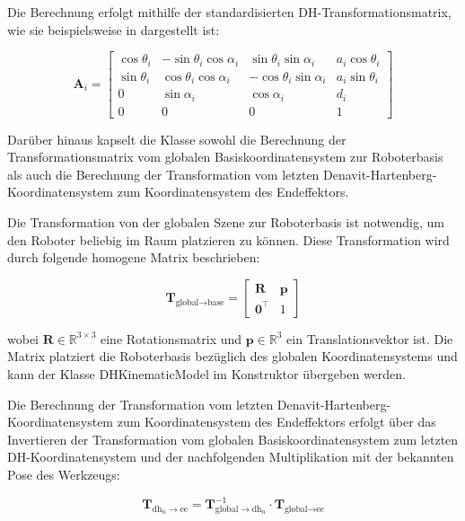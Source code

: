 Die Berechnung erfolgt mithilfe der standardisierten DH-Transformationsmatrix, wie sie beispielsweise in  dargestellt ist:

\[
    \mathbf{A}_i =
    \begin{bmatrix}
    \cos\theta_i & -\sin\theta_i\cos\alpha_i & \sin\theta_i\sin\alpha_i & a_i\cos\theta_i \\
    \sin\theta_i & \cos\theta_i\cos\alpha_i  & -\cos\theta_i\sin\alpha_i & a_i\sin\theta_i \\
    0            & \sin\alpha_i              & \cos\alpha_i              & d_i \\
    0            & 0                         & 0                         & 1
    \end{bmatrix}
\]



Darüber hinaus kapselt die Klasse sowohl die Berechnung der Transformationsmatrix vom globalen Basiskoordinatensystem zur Roboterbasis
als auch die Berechnung der Transformation vom letzten Denavit-Hartenberg-Koordinatensystem zum Koordinatensystem des Endeffektors.



Die Transformation von der globalen Szene zur Roboterbasis ist notwendig, um den Roboter beliebig im Raum platzieren zu können.
Diese Transformation wird durch folgende homogene Matrix beschrieben:


\[
    \mathbf{T}_{\text{global} \rightarrow \text{base}} =
    \begin{bmatrix}
    \mathbf{R} & \mathbf{p} \\
    \mathbf{0}^\top & 1
    \end{bmatrix}
\]

wobei \( \mathbf{R} \in \mathbb{R}^{3 \times 3} \) eine Rotationsmatrix und \( \mathbf{p} \in \mathbb{R}^3 \) ein Translationsvektor ist.
Die Matrix platziert die Roboterbasis bezüglich des globalen Koordinatensystems und kann der Klasse DHKinematicModel im Konstruktor übergeben werden.


Die Berechnung der Transformation vom letzten Denavit-Har\-ten\-berg-Ko\-or\-di\-na\-ten\-sys\-tem zum Koordinatensystem des Endeffektors 
erfolgt über das Invertieren der Transformation vom globalen Basiskoordinatensystem zum letzten DH-Koordinatensystem und der nachfolgenden
Multiplikation mit der bekannten Pose des Werkzeugs:

\[
    \mathbf{T}_{\text{dh}_n \rightarrow \text{ee}} = \mathbf{T}_{\text{global} \rightarrow \text{dh}_n}^{-1} \cdot \mathbf{T}_{\text{global} \rightarrow \text{ee}}
\]

